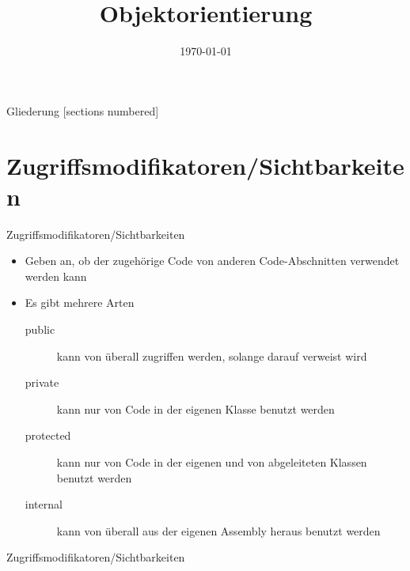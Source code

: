 



\title{Objektorientierung}
\date{\today}




\maketitle

\begin{frame}{Gliederung}
	[sections numbered]
	\tableofcontents
\end{frame}

\section{Zugriffsmodifikatoren/Sichtbarkeiten}
\begin{frame}{Zugriffsmodifikatoren/Sichtbarkeiten}
	\begin{itemize}
		\item Geben an, ob der zugehörige Code von anderen Code-Abschnitten verwendet werden kann
		\item Es gibt mehrere Arten
		\begin{description}
			\item[public] kann von überall zugriffen werden, solange darauf verweist wird
			\item[private] kann nur von Code in der eigenen Klasse benutzt werden
			\item[protected] kann nur von Code in der eigenen und von abgeleiteten Klassen benutzt werden
			\item[internal] kann von überall aus der eigenen Assembly heraus benutzt werden
		\end{description}
	\end{itemize}
\end{frame}

\begin{frame}{Zugriffsmodifikatoren/Sichtbarkeiten}
	
\end{frame}

